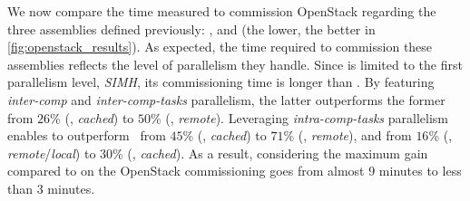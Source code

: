 We now compare the time measured to commission OpenStack regarding the
three assemblies defined previously: \ansass, \aeoass and \madass (the
lower, the better in \cref{fig:openstack_results}).  As expected, the
time required to commission these assemblies reflects the level of
parallelism they handle. Since \ansass is limited to the first
parallelism level, \ie \emph{SIMH}, its commissioning time is longer
than \aeoass. By featuring \emph{inter-comp} and
\emph{inter-comp-tasks} parallelism, the latter outperforms the former
from $26$\% (\nova, \emph{cached}) to $50$\% (\ecotype,
\emph{remote}). Leveraging \emph{intra-comp-tasks} parallelism enables
\madass to outperform \ansass~from $45$\% (\nova, \emph{cached}) to
$71$\% (\ecotype, \emph{remote}), and \aeoass from $16$\% (\nova,
\emph{remote}/\emph{local}) to $30$\% (\ecotype, \emph{cached}). As a
result, considering the maximum gain compared to \ansass on \ecotype
the OpenStack commissioning goes from almost 9 minutes to less than 3
minutes.
%

